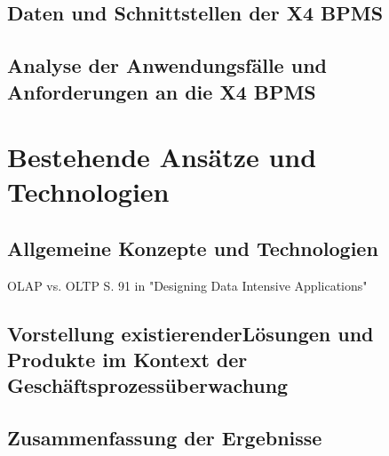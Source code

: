 \subsection{Daten und Schnittstellen der X4 BPMS}
\subsection{Analyse der Anwendungsfälle und Anforderungen an die X4 BPMS}

\section{Bestehende Ansätze und Technologien}
\subsection{Allgemeine Konzepte und Technologien}
OLAP vs. OLTP \cite{kleppmann2017} S. 91 in "Designing Data Intensive Applications" 

\subsection{Vorstellung existierenderLösungen und Produkte im Kontext der Geschäftsprozessüberwachung}
\subsection{Zusammenfassung der Ergebnisse}

